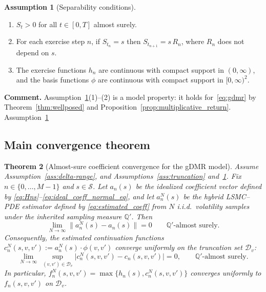 \documentclass[10pt]{article}
\theoremstyle{plain}
\newtheorem{theorem}{Theorem}[section]
\theoremstyle{definition}
\newtheorem{assumption}[theorem]{Assumption}
\theoremstyle{remark}
\begin{document}
\begin{assumption}[Separability conditions]
\label{ass:separability}
\begin{enumerate}
\item $S_t>0$ for all $t\in[0,T]$ almost surely.
\item For each exercise step $n$, if $S_{t_n}=s$ then $S_{t_{n+1}}=s\,R_n$, where $R_n$ does not depend on $s$.
\item The exercise functions $h_n$ are continuous with compact support in $(0,\infty)$, and the basis functions
$\phi$ are continuous with compact support in $[0,\infty)^2$.
\end{enumerate}
\end{assumption}

\noindent\textbf{Comment.}
Assumption~\ref{ass:separability}(1)--(2) is a model property: it holds for~\eqref{eq:gdmr} by Theorem~\ref{thm:wellposed}
and Proposition~\ref{prop:multiplicative_return}. Assumption~\ref{ass:separability}



\subsection{Main convergence theorem}
\label{subsec:main_convergence}

\begin{theorem}[Almost-sure coefficient convergence for the gDMR model]
\label{thm:as_coeff_convergence}
Assume Assumption~\ref{ass:delta-range}, and Assumptions~\ref{ass:truncation}
and~\ref{ass:separability}. Fix $n\in\{0,\dots,M-1\}$ and $s\in\mathcal{S}$.
Let $a_n(s)$ be the idealized coefficient vector defined by \eqref{eq:Hns}--\eqref{eq:ideal_coeff_normal_eq}, and let
$a_n^N(s)$ be the hybrid LSMC--PDE estimator defined by \eqref{eq:estimated_coeff} from $N$ i.i.d.\ volatility samples
under the inherited sampling measure $\mathbb{Q}'$.
Then
\[
\lim_{N\to\infty} \bigl\|a_n^N(s)-a_n(s)\bigr\| = 0
\qquad \mathbb{Q}'\text{-almost surely}.
\]
Consequently, the estimated continuation functions
$c_n^N(s,v,v') := a_n^N(s)\cdot\phi(v,v')$ converge \emph{uniformly} on the truncation set $\mathcal{D}_v$:
\[
\lim_{N\to\infty}\ \sup_{(v,v')\in\mathcal{D}_v}
\bigl|c_n^N(s,v,v')-c_n(s,v,v')\bigr| = 0,
\qquad \mathbb{Q}'\text{-almost surely}.
\]
In particular, $f_n^N(s,v,v')=\max\{h_n(s),c_n^N(s,v,v')\}$ converges uniformly to $f_n(s,v,v')$ on $\mathcal{D}_v$.
\end{theorem}
\end{document}
